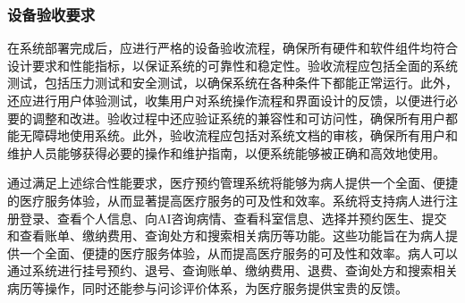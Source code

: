 \subsubsection{设备验收要求}
在系统部署完成后，应进行严格的设备验收流程，确保所有硬件和软件组件均符合设计要求和性能指标，以保证系统的可靠性和稳定性。验收流程应包括全面的系统测试，包括压力测试和安全测试，以确保系统在各种条件下都能正常运行。此外，还应进行用户体验测试，收集用户对系统操作流程和界面设计的反馈，以便进行必要的调整和改进。验收过程中还应验证系统的兼容性和可访问性，确保所有用户都能无障碍地使用系统。此外，验收流程应包括对系统文档的审核，确保所有用户和维护人员能够获得必要的操作和维护指南，以便系统能够被正确和高效地使用。

通过满足上述综合性能要求，医疗预约管理系统将能够为病人提供一个全面、便捷的医疗服务体验，从而显著提高医疗服务的可及性和效率。系统将支持病人进行注册登录、查看个人信息、向AI咨询病情、查看科室信息、选择并预约医生、提交和查看账单、缴纳费用、查询处方和搜索相关病历等功能。这些功能旨在为病人提供一个全面、便捷的医疗服务体验，从而提高医疗服务的可及性和效率。病人可以通过系统进行挂号预约、退号、查询账单、缴纳费用、退费、查询处方和搜索相关病历等操作，同时还能参与问诊评价体系，为医疗服务提供宝贵的反馈。